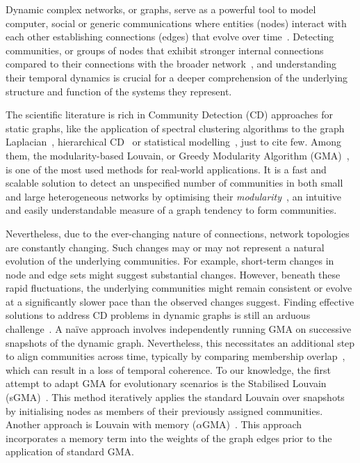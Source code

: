 \documentclass[letterpaper]{article}
\begin{document}
Dynamic complex networks, or graphs, serve as a powerful tool to model computer, social or generic communications where entities (nodes) interact with each other establishing connections (edges) that evolve over time~\cite{wang2019time,dakiche2019survey}. Detecting communities, or groups of nodes that exhibit stronger internal connections compared to their connections with the broader network~\cite{girvan2002community}, and understanding their temporal dynamics is crucial for a deeper comprehension of the underlying structure and function of the systems they represent.

The scientific literature is rich in Community Detection (CD) approaches for static graphs, like the application of spectral clustering algorithms to the graph Laplacian~\cite{ng2001spectral,dall2020spectral2}, hierarchical CD~\cite{li2022hierarchical} or statistical modelling~\cite{peixoto2019statistical,geng2019probabilistic}, just to cite few. Among them, the modularity-based Louvain, or Greedy Modularity Algorithm (GMA)~\cite{blondel2008louvain}, is one of the most used methods for real-world applications. It is a fast and scalable solution to detect an unspecified number of communities in both small and large heterogeneous networks by optimising their \emph{modularity}~\cite{newman2006modularity}, an intuitive and easily understandable measure of a graph tendency to form communities.


Nevertheless, due to the ever-changing nature of connections, network topologies are constantly changing. Such changes may or may not represent a natural evolution of the underlying communities.
For example, short-term changes in node and edge sets might suggest substantial changes. However, beneath these rapid fluctuations, the underlying communities might remain consistent or evolve at a significantly slower pace than the observed changes suggest. Finding effective solutions to address CD problems in dynamic graphs is still an arduous challenge~\cite{dakiche2019survey}. A na\"ive approach involves independently running GMA on successive snapshots of the dynamic graph. Nevertheless, this necessitates an additional step to align communities across time, typically by comparing membership overlap~\cite{spiliopoulou2013monic}, which can result in a loss of temporal coherence.
To our knowledge, the first attempt to adapt GMA for evolutionary scenarios is the Stabilised Louvain (sGMA)~\cite{aynaud2010smoothed}. This method iteratively applies the standard Louvain over snapshots by initialising nodes as members of their previously assigned communities. Another approach is Louvain with memory ($\alpha$GMA)~\cite{elegazzar2021alpha}. This approach incorporates a memory term into the weights of the graph edges prior to the application of standard GMA.
\end{document}

